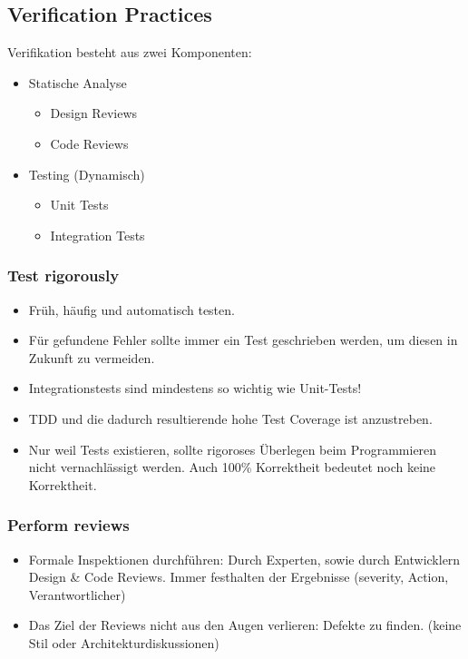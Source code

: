 \subsection{Verification Practices}

Verifikation besteht aus zwei Komponenten:
\begin{itemize}
	\item Statische Analyse
		\begin{itemize}
			\item Design Reviews
			\item Code Reviews
		\end{itemize}
	\item Testing (Dynamisch)
		\begin{itemize}
			\item Unit Tests
			\item Integration Tests
		\end{itemize}
\end{itemize}

\subsubsection{Test rigorously}
\begin{itemize}
	\item Früh, häufig und automatisch testen.
	\item Für gefundene Fehler sollte immer ein Test geschrieben werden, um diesen in Zukunft zu vermeiden.
	\item Integrationstests sind mindestens so wichtig wie Unit-Tests!
	\item TDD und die dadurch resultierende hohe Test Coverage ist anzustreben.
	\item Nur weil Tests existieren, sollte rigoroses Überlegen beim Programmieren nicht vernachlässigt werden. Auch 100\% Korrektheit bedeutet noch keine Korrektheit.
\end{itemize}


\subsubsection{Perform reviews}
\begin{itemize}
	\item Formale Inspektionen durchführen: Durch Experten, sowie durch Entwicklern Design \& Code Reviews. Immer festhalten der Ergebnisse (severity, Action, Verantwortlicher)
	\item Das Ziel der Reviews nicht aus den Augen verlieren: Defekte zu finden. (keine Stil oder Architekturdiskussionen)
\end{itemize}

